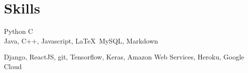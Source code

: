 
\section{Skills}
Python \textbullet{}   C \\
Java, C++, Javascript, \LaTeX\, MySQL, Markdown
\sectionsep

Django, ReactJS, git, Tensorflow, Keras, Amazon Web Services, Heroku, Google Cloud
\sectionsep